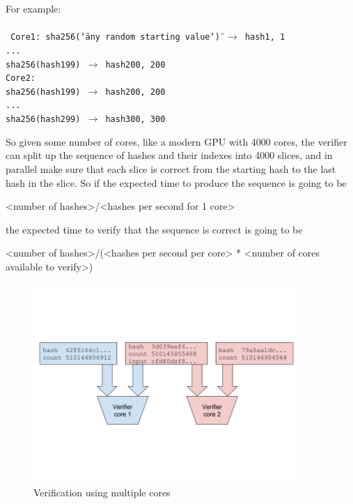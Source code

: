 \documentclass[12pt]{article}
\begin{document}
\noindent For example: \\\\\noindent
\texttt{
Core1:
sha256(\char`\"any random starting value\char`\") $\rightarrow$ hash1, 1\\
...\\
sha256(hash199) $\rightarrow$ hash200, 200\\

Core2:\\
sha256(hash199) $\rightarrow$ hash200, 200\\
...\\
sha256(hash299) $\rightarrow$ hash300, 300\\
}

So given some number of cores, like a modern GPU with 4000 cores, the verifier can split up the sequence of hashes and their indexes into 4000 slices, and in parallel make sure that each slice is correct from the starting hash to the last hash in the slice.  So if the expected time to produce the sequence is going to be 

<number of hashes>/<hashes per second for 1 core>

the expected time to verify that the sequence is correct is going to be 

<number of hashes>/(<hashes per second per core> * <number of cores available to verify>)

\begin{figure}
  \begin{center}
    \centering
    \includegraphics[width=0.9\textwidth]{figures/fig_3.png}
    \caption[Figure 3]{Verification using multiple cores\label{fig_3}}
  \end{center}
  \end{figure}
\end{document}
